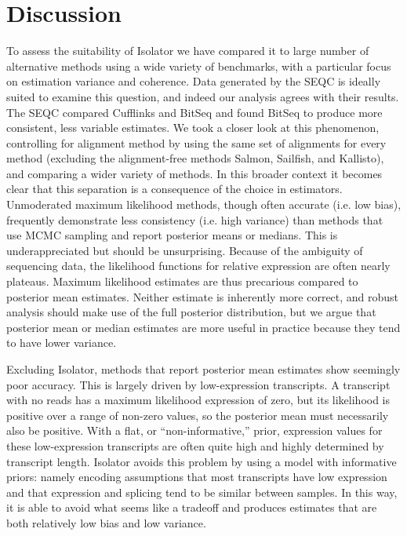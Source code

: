 \documentclass[twocolumn]{article}
\begin{document}
\section{Discussion}\label{discussion}

To assess the suitability of Isolator we have compared it to large number of
alternative methods using a wide variety of benchmarks, with a particular focus
on estimation variance and coherence. Data generated by the SEQC is ideally
suited to examine this question, and indeed our analysis agrees with their
results. The SEQC compared Cufflinks and BitSeq and found BitSeq to produce more
consistent, less variable estimates. We took a closer look at this phenomenon,
controlling for alignment method by using the same set of alignments for every
method (excluding the alignment-free methods Salmon, Sailfish, and Kallisto),
and comparing a wider variety of methods. In this broader context it becomes
clear that this separation is a consequence of the choice in estimators.
Unmoderated maximum likelihood methods, though often accurate (i.e. low bias),
frequently demonstrate less consistency (i.e. high variance) than methods that
use MCMC sampling and report posterior means or medians. This is
underappreciated but should be unsurprising.  Because of the ambiguity of
sequencing data, the likelihood functions for relative expression are often
nearly plateaus. Maximum likelihood estimates are thus precarious compared to
posterior mean estimates. Neither estimate is inherently more correct, and
robust analysis should make use of the full posterior distribution, but we argue
that posterior mean or median estimates are more useful in practice because they
tend to have lower variance.

Excluding Isolator, methods that report posterior mean estimates show seemingly
poor accuracy. This is largely driven by low-expression transcripts. A
transcript with no reads has a maximum likelihood expression of zero, but its
likelihood is positive over a range of non-zero values, so the posterior mean
must necessarily also be positive. With a flat, or ``non-informative,'' prior,
expression values for these low-expression transcripts are often quite high and
highly determined by transcript length. Isolator avoids this problem by using a
model with informative priors: namely encoding assumptions that most transcripts
have low expression and that expression and splicing tend to be similar between
samples. In this way, it is able to avoid what seems like a tradeoff and
produces estimates that are both relatively low bias and low variance.
\end{document}
